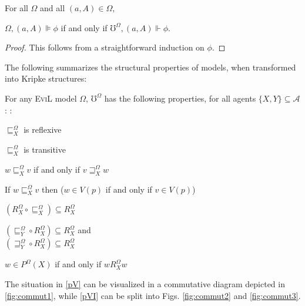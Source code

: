 \begin{lemma}
  \label{tranlemma1} For all $\Omega$ and all $(a, A) \in \Omega$,  
\begin{center} 
$\Omega, (a, A) \VDash \phi$ if and only if $\mho^{\Omega}, (a, A) \Vdash \phi$.
\end{center}
\end{lemma}
\begin{proof}
  This follows from a straightforward induction on $\phi$.
\end{proof}
The following summarizes the structural properties of
 models, when transformed into Kripke structures:
\begin{proposition}\label{evil_models}
  For any \textsc{EviL} model $\Omega$,  $\mho^{\Omega}$ has the following
  properties, for all agents $\{X,Y\} \subseteq \mathcal{A}$:
:
  \begin{myRoman}
    \item\label{pI} $\sqsubseteq^{\Omega}_X$ is reflexive
    \item\label{pII} $\sqsubseteq^{\Omega}_X$ is transitive 
    \item \label{preverse} $w \sqsubseteq^{\Omega}_X v$ if and only if 
     $v \sqsupseteq^{\Omega}_X w$
    \item \label{pislandiff} If $w \sqsubseteq^{\Omega}_X v$ then ($w
      \in V (p)$ if and only if $v \in V (p)$)
    \item \label{pV}$(R^{\Omega}_X \circ \sqsubseteq^{\Omega}_X) \subseteq R^{\Omega}_X$
    \item \label{pVI} $(\sqsubseteq^{\Omega}_Y \circ R^{\Omega}_X)
      \subseteq R^{\Omega}_X$ and\\
    $(\sqsupseteq^{\Omega}_Y \circ R^{\Omega}_X) \subseteq
    R^{\Omega}_X$
    \item\label{pVII} $w \in P^{\Omega} (X)$ if and only if $w
    R^{\Omega}_X w$
  \end{myRoman}
  The situation in \ref{pV} can be visualized in a commutative diagram
  depicted in
  \ref{fig:commut1}, while \ref{pVI} can be split into
  Figs. \ref{fig:commut2} and \ref{fig:commut3}.
\end{proposition}
